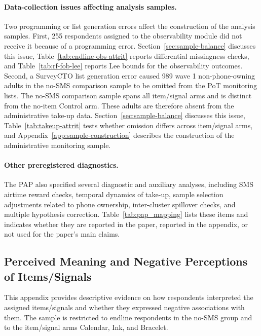 \documentclass[ECM\space ReStud.tex]{subfiles}
\begin{document}
\paragraph{Data-collection issues affecting analysis samples.}
Two programming or list generation errors affect the construction of the analysis samples. First, 255 respondents assigned to the observability module did not receive it because of a programming error. Section~\ref{sec:sample-balance} discusses this issue, Table~\ref{tab:endline-obs-attrit} reports differential missingness checks, and Table~\ref{tab:rf-fob-lee} reports Lee bounds for the observability outcomes. Second, a SurveyCTO list generation error caused 989 wave 1 non-phone-owning adults in the no-SMS comparison sample to be omitted from the PoT monitoring lists. The no-SMS comparison sample spans all item/signal arms and is distinct from the no-item Control arm. These adults are therefore absent from the administrative take-up data. Section~\ref{sec:sample-balance} discusses this issue, Table~\ref{tab:takeup-attrit} tests whether omission differs across item/signal arms, and Appendix~\ref{app:sample-construction} describes the construction of the administrative monitoring sample.

\paragraph{Other preregistered diagnostics.}
The PAP also specified several diagnostic and auxiliary analyses, including SMS airtime reward checks, temporal dynamics of take-up, sample selection adjustments related to phone ownership, inter-cluster spillover checks, and multiple hypothesis correction. Table~\ref{tab:pap_mapping} lists these items and indicates whether they are reported in the paper, reported in the appendix, or not used for the paper's main claims.


\begin{landscape}

\end{landscape}
\newpage

\FloatBarrier



\subsection{Perceived Meaning and Negative Perceptions of Items/Signals}
\label{app:bad_incentive}

This appendix provides descriptive evidence on how respondents interpreted the assigned items/signals and whether they expressed negative associations with them. The sample is restricted to endline respondents in the no-SMS group and to the item/signal arms Calendar, Ink, and Bracelet.
\end{document}
